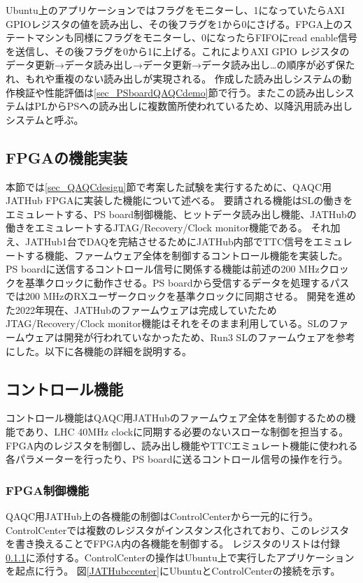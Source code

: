 Ubuntu上のアプリケーションではフラグをモニターし、1になっていたらAXI GPIOレジスタの値を読み出し、その後フラグを1から0にさげる。FPGA上のステートマシンも同様にフラグをモニターし、0になったらFIFOにread enable信号を送信し、その後フラグを0から1に上げる。これによりAXI GPIO レジスタのデータ更新→データ読み出し→データ更新→データ読み出し…の順序が必ず保たれ、もれや重複のない読み出しが実現される。
作成した読み出しシステムの動作検証や性能評価は\ref{sec_PSboardQAQCdemo}節で行う。またこの読み出しシステムはPLからPSへの読み出しに複数箇所使われているため、以降汎用読み出しシステムと呼ぶ。


\subsection{FPGAの機能実装}
\label{subsec_function}
本節では\ref{sec_QAQCdesign}節で考案した試験を実行するために、QAQC用JATHub FPGAに実装した機能について述べる。
要請される機能はSLの働きをエミュレートする、PS board制御機能、ヒットデータ読み出し機能、JATHubの働きをエミュレートするJTAG/Recovery/Clock monitor機能である。
それ加え、JATHub1台でDAQを完結させるためにJATHub内部でTTC信号をエミュレートする機能、ファームウェア全体を制御するコントロール機能を実装した。
PS boardに送信するコントロール信号に関係する機能は前述の200 MHzクロックを基準クロックに動作させる。PS boardから受信するデータを処理するパスでは200 MHzのRXユーザークロックを基準クロックに同期させる。
開発を進めた2022年現在、JATHubのファームウェアは完成していたためJTAG/Recovery/Clock monitor機能はそれをそのまま利用している。SLのファームウェアは開発が行われていなかったため、Run3 SLのファームウェアを参考にした。以下に各機能の詳細を説明する。

\subsection*{\textbf{コントロール機能}}
\label{subsubsec_control}
コントロール機能はQAQC用JATHubのファームウェア全体を制御するための機能であり、LHC 40MHz clockに同期する必要のないスローな制御を担当する。FPGA内のレジスタを制御し、読み出し機能やTTCエミュレート機能に使われる各パラメーターを行ったり、PS boardに送るコントロール信号の操作を行う。

\subsubsection{FPGA制御機能}
QAQC用JATHub上の各機能の制御はControlCenterから一元的に行う。
ControlCenterでは複数のレジスタがインスタンス化されており、このレジスタを書き換えることでFPGA内の各機能を制御する。
レジスタのリストは付録\ref{}に添付する。ControlCenterの操作はUbuntu上で実行したアプリケーションを起点に行う。
図\ref{JATHubccenter}にUbuntuとControlCenterの接続を示す。

